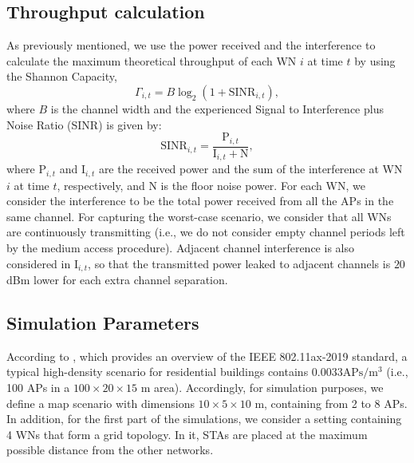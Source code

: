 \documentclass[preprint,12pt]{elsarticle}
\begin{document}
\subsection{Throughput calculation}
\label{section:throughput_calculation}
As previously mentioned, we use the power received and the interference to calculate the maximum theoretical throughput of each WN $i$ at time $t$ by using the Shannon Capacity,
\begin{equation}
\Gamma_{i,t} = B  \log_{2}(1 + \text{SINR}_{i, t}),
\nonumber
\label{eq:shannon_capacity}
\end{equation}
where $B$ is the channel width and the experienced Signal to Interference plus Noise Ratio (SINR) is given by:
\begin{equation}
\text{SINR}_{i,t} = \frac{\text{P}_{i,t}}{\text{I}_{i,t}+\text{N}},
\label{eq:sinr}
\nonumber
\end{equation}
where $\text{P}_{i,t}$ and $\text{I}_{i,t}$ are the received power and the sum of the interference at WN $i$ at time $t$, respectively, and N is the floor noise power. For each WN, we consider the interference to be the total power received from all the APs in the same channel. For capturing the worst-case scenario, we consider that all WNs are continuously transmitting (i.e., we do not consider empty channel periods left by the medium access procedure). Adjacent channel interference is also considered in $\text{I}_{i,t}$, so that the transmitted power leaked to adjacent channels is $20$ dBm lower for each extra channel separation.

\subsection{Simulation Parameters}
\label{section:simulation_parameters}
According to \cite{bellalta2016ax}, which provides an overview of the IEEE 802.11ax-2019 standard, a typical high-density scenario for residential buildings contains $0.0033 \text{APs}/\text{m}^3$ (i.e., 100 APs in a $100 \times 20 \times 15$ m area). Accordingly, for simulation purposes, we define a map scenario with dimensions $10\times5\times10$ m, containing from 2 to 8 APs. In addition, for the first part of the simulations, we consider a setting containing 4 WNs that form a grid topology. In it, STAs are placed at the maximum possible distance from the other networks. 
\end{document}
